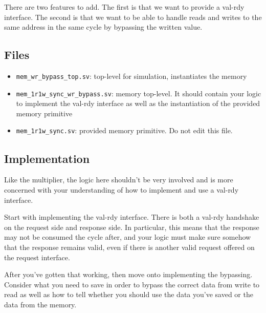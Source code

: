 \documentclass{article}
\begin{document}
There are two features to add. The first is that we want to provide a val-rdy
interface. The second is that we want to be able to handle reads and writes to
the same address in the same cycle by bypassing the written value.

\subsection*{Files}
\begin{itemize}
    \item \texttt{mem\_wr\_bypass\_top.sv}: top-level for simulation,
    instantiates the memory
    \item \texttt{mem\_1r1w\_sync\_wr\_bypass.sv}: memory top-level. It should
    contain your logic to implement the val-rdy interface as well as the
    instantiation of the provided memory primitive
    \item \texttt{mem\_1r1w\_sync.sv}: provided memory primitive. Do not edit
    this file.
\end{itemize}

\subsection*{Implementation}
Like the multiplier, the logic here shouldn't be very involved and is more
concerned with your understanding of how to implement and use a val-rdy
interface.

Start with implementing the val-rdy interface. There is both a val-rdy handshake
on the request side and response side. In particular, this means that the
response may not be consumed the cycle after, and your logic must make sure
somehow that the response remains valid, even if there is another valid request
offered on the request interface.

After you've gotten that working, then move onto implementing the bypassing.
Consider what you need to save in order to bypass the correct data from write to
read as well as how to tell whether you should use the data you've saved or the
data from the memory.
\end{document}
